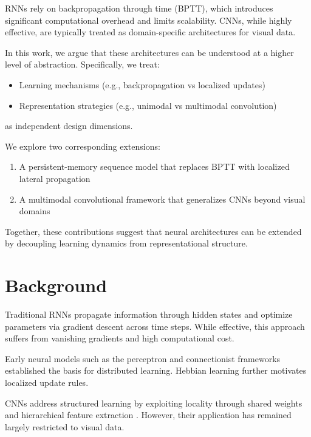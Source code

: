 \documentclass[lineno]{wlpeerj}
\begin{document}
	RNNs rely on backpropagation through time (BPTT), which introduces significant computational overhead and limits scalability. CNNs, while highly effective, are typically treated as domain-specific architectures for visual data.
	
	In this work, we argue that these architectures can be understood at a higher level of abstraction. Specifically, we treat:
	
	\begin{itemize}
		\item Learning mechanisms (e.g., backpropagation vs localized updates)
		\item Representation strategies (e.g., unimodal vs multimodal convolution)
	\end{itemize}
	
	as independent design dimensions.
	
	We explore two corresponding extensions:
	
	\begin{enumerate}
		\item A persistent-memory sequence model that replaces BPTT with localized lateral propagation
		\item A multimodal convolutional framework that generalizes CNNs beyond visual domains
	\end{enumerate}
	
	Together, these contributions suggest that neural architectures can be extended by decoupling learning dynamics from representational structure.
	
	\section{Background}
	
	Traditional RNNs propagate information through hidden states and optimize parameters via gradient descent across time steps. While effective, this approach suffers from vanishing gradients and high computational cost.
	
	Early neural models such as the perceptron \cite{rosenblatt1958perceptron} and connectionist frameworks \cite{rumelhart1986pdp} established the basis for distributed learning. Hebbian learning \cite{hebb1949organization} further motivates localized update rules.
	
	CNNs address structured learning by exploiting locality through shared weights and hierarchical feature extraction \cite{lecun1998gradient}. However, their application has remained largely restricted to visual data.
	
\end{document}
